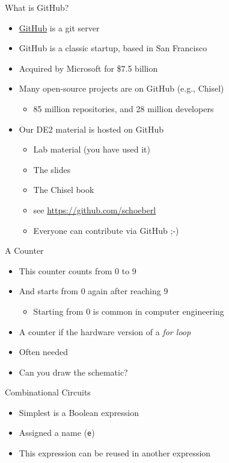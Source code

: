 \documentclass[xcolor=pdflatex,dvipsnames,table]{beamer}
\newcommand{\code}[1]{{\texttt{#1}}}
\begin{document}
\begin{frame}[fragile]{What is GitHub?}
\begin{itemize}
\item \href{https://github.com/}{GitHub} is a git server
\item GitHub is a classic startup, based in San Francisco
\item Acquired by Microsoft for \$7.5 billion
\item Many open-source projects are on GitHub (e.g., Chisel)
\begin{itemize}
\item 85 million repositories, and 28 million developers
\end{itemize}
\item Our DE2 material is hosted on GitHub
\begin{itemize}
\item Lab material (you have used it)
\item The slides
\item The Chisel book
\item see \url{https://github.com/schoeberl}
\item Everyone can contribute via GitHub ;-)
\end{itemize}
\end{itemize}
\end{frame}

\begin{frame}[fragile]{A Counter}
\begin{itemize}
\item This counter counts from 0 to 9
\item And starts from 0 again after reaching 9
\begin{itemize}
\item Starting from 0 is common in computer engineering
\end{itemize}
\item A counter if the hardware version of a \emph{for loop}
\item Often needed
\item Can you draw the schematic?
\end{itemize}
\end{frame}

\begin{frame}[fragile]{Combinational Circuits}
\begin{itemize}
\item Simplest is a Boolean expression
\item Assigned a name (\code{e})
\item This expression can be reused in another expression
\end{itemize}
\end{frame}
\end{document}
